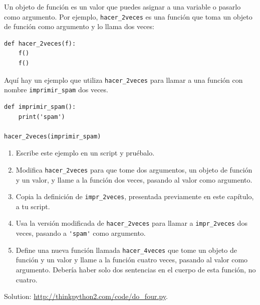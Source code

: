 \documentclass[10pt]{book}
\begin{document}
\begin{exercise}

Un objeto de función es un valor que puedes asignar a una variable o
pasarlo como argumento.  Por ejemplo, \verb"hacer_2veces" es una función
que toma un objeto de función como argumento y lo llama dos veces:

\begin{verbatim}
def hacer_2veces(f):
    f()
    f()
\end{verbatim}

Aquí hay un ejemplo que utiliza \verb"hacer_2veces" para llamar a una función
con nombre \verb"imprimir_spam" dos veces.

\begin{verbatim}
def imprimir_spam():
    print('spam')

hacer_2veces(imprimir_spam)
\end{verbatim}

\begin{enumerate}

\item Escribe este ejemplo en un script y pruébalo.

\item Modifica \verb"hacer_2veces" para que tome dos argumentos, un
objeto de función y un valor, y llame a la función dos veces,
pasando al valor como argumento.

\item Copia la definición de
\verb"impr_2veces", presentada previamente en este capítulo, a tu script.

\item Usa la versión modificada de \verb"hacer_2veces" para llamar a
\verb"impr_2veces" dos veces, pasando a \verb"'spam'" como argumento.

\item Define una nueva función llamada
\verb"hacer_4veces" que tome un objeto de función y un valor
y llame a la función cuatro veces, pasando al valor
como argumento.  Debería haber solo
dos sentencias en el cuerpo de esta función, no cuatro.

\end{enumerate}

Solution: \url{http://thinkpython2.com/code/do_four.py}.

\end{exercise}
\end{document}
